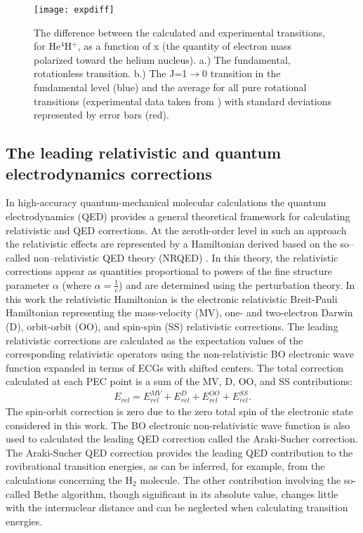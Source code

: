 \documentclass[aps,onecolumn]{revtex4}
\begin{document}
\begin{figure}
\caption{The difference between the calculated and experimental transitions, for He$^4$H$^+$,
as a function of x (the quantity of electron mass polarized toward the helium nucleus). a.) The
fundamental, rotationless transition. b.) The J=1$\rightarrow$0 transition in the fundamental level
(blue) and the average for all pure rotational transitions (experimental data taken from \cite{exp1, exp7,
exp9}) with standard deviations represented by error bars (red).}
\texttt{[image: expdiff]}
\label{xvsdiff}
\end{figure}

\subsection{The leading relativistic and quantum electrodynamics corrections}

In high-accuracy quantum-mechanical molecular calculations
the quantum electrodynamics (QED) provides a
general theoretical framework
for calculating relativistic and QED corrections.
At the zeroth-order level in such an approach 
the relativistic effects are represented by
a Hamiltonian derived based on the so--called non--relativistic QED
theory (NRQED) \cite{d17,d18,d19,d20}.
In this theory, the relativistic corrections
appear as quantities proportional to powers of
the fine structure parameter $\alpha$ (where $\alpha = \frac{1}{c}$)
and are determined using the perturbation theory.
In this work the relativistic Hamiltonian is the
electronic relativistic Breit-Pauli Hamiltonian \cite{BS1977}
representing the mass-velocity (MV), one- and two-electron
Darwin (D), orbit-orbit (OO), and spin-spin (SS) relativistic corrections.
The leading relativistic corrections are calculated as the expectation values
of the corresponding relativistic operators using the non-relativistic
BO electronic wave function expanded in terms of
ECGs with shifted centers. The total correction calculated
at each PEC point is a sum of the MV, D, OO, and SS contributions:
\begin{eqnarray}
E_{rel} = E_{rel}^{MV} +  E_{rel}^{D} +  E_{rel}^{OO} +  E_{rel}^{SS}.
\end{eqnarray}
The spin-orbit correction is zero due to the zero total spin
of the electronic state considered in this work. 
The BO electronic non-relativistic wave function
is also used to calculated the leading QED correction
called the Araki-Sucher correction.
The Araki-Sucher QED correction \cite{Be,Ar,Su} provides the leading
QED contribution to the rovibrational transition energies, as can be inferred, for example,
from the calculations concerning the H$_2$ molecule\cite{Jeziorski}.
The other contribution involving the so-called Bethe algorithm,
though significant in its absolute value, changes little with the internuclear
distance and can be neglected when calculating transition energies.
\end{document}
